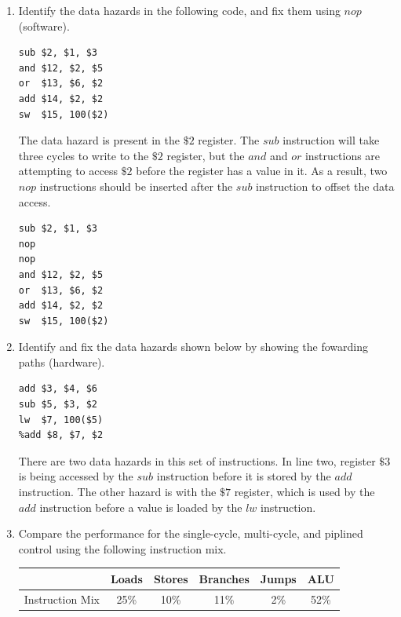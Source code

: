 \documentclass{article}
\newcommand{\sqr}{$\square \qquad|$ & $\square \qquad|$ & $>\qquad|$ & $\square\qquad|$ & $\square\ \qquad$ }
\begin{document}
\begin{enumerate}
\item Identify the data hazards in the following code, and fix them using $nop$ (software).
\begin{center}
\begin{verbatim}
sub $2, $1, $3
and $12, $2, $5
or  $13, $6, $2
add $14, $2, $2
sw  $15, 100($2)
\end{verbatim}
\end{center}
\indent The data hazard is present in the $\$2$ register.
The $sub$ instruction will take three cycles to write to the $\$2$ register, but the $and$ and $or$ instructions are attempting to access $\$2$ before the register has a value in it.
As a result, two $nop$ instructions should be inserted after the $sub$ instruction to offset the data access.
\begin{verbatim}
sub $2, $1, $3
nop
nop
and $12, $2, $5
or  $13, $6, $2
add $14, $2, $2
sw  $15, 100($2)
\end{verbatim}
\item Identify and fix the data hazards shown below by showing the fowarding paths (hardware).
\begin{verbatim}
add $3, $4, $6
sub $5, $3, $2
lw  $7, 100($5)
%add $8, $7, $2
\end{verbatim}
There are two data hazards in this set of instructions.
In line two, register $\$3$ is being accessed by the $sub$ instruction before it is stored by the $add$ instruction.
The other hazard is with the $\$7$ register, which is used by the $add$ instruction before a value is loaded by the $lw$ instruction.\\
\item Compare the performance for the single-cycle, multi-cycle, and piplined control using the following instruction mix.
\begin{center}
\begin{tabular}{|l|c|c|c|c|c|}
\hline
& Loads & Stores & Branches & Jumps & ALU\\
\hline
Instruction Mix & 25\% & 10\% & 11\% & 2\% & 52\%\\

\end{tabular}
\end{center}
\end{enumerate}
\end{document}
